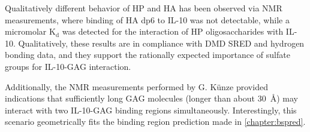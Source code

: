 Qualitatively different behavior of HP and HA has been observed via NMR
measurements, where binding of HA dp6 to IL-10 was not detectable, while a
micromolar $\mathrm{K}_\mathrm{d}$ was detected for the interaction of HP
oligosaccharides with IL-10. Qualitatively, these results are in compliance with
DMD SRED and hydrogen bonding data, and they support the rationally expected
importance of sulfate groups for IL-10-GAG interaction.

Additionally, the NMR measurements performed by G. Künze provided indications
that sufficiently long GAG molecules (longer than about \SI{30}{\angstrom}) may
interact with two IL-10-GAG binding regions simultaneously. Interestingly, this
scenario geometrically fits the binding region prediction made in
\cref{chapter:bspred}.
